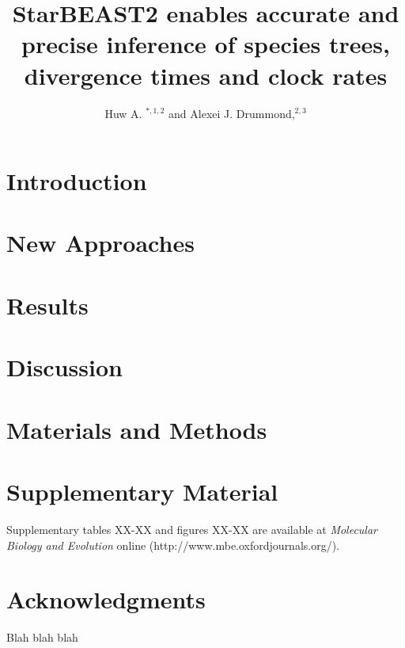 \documentclass[nogrid]{MBE}
\begin{document}
\title[StarBEAST2]{StarBEAST2 enables accurate and precise inference of species trees, divergence times and clock rates}


\author[Ogilvie and Drummond]{Huw A. $^{\ast,1,2}$ and Alexei J. Drummond,$^{2,3}$}

\address{$^{1}$Department of Evolution, Ecology and Genetics, Australian National University, Canberra, Australia\\
$^{2}$Centre for Computational Evolution, University of Auckland, Auckland, New Zealand\\
$^{3}$Department of Computer Science, University of Auckland, Auckland, New Zealand}






\maketitle


\section{Introduction}


\section{New Approaches}


\section{Results}


\section{Discussion}


\section{Materials and Methods}


\section{Supplementary Material}
Supplementary tables XX-XX and figures XX-XX are available at \textit{Molecular Biology and Evolution} online (http://www.mbe.oxfordjournals.org/).


\section{Acknowledgments}
Blah blah blah




\end{document}
